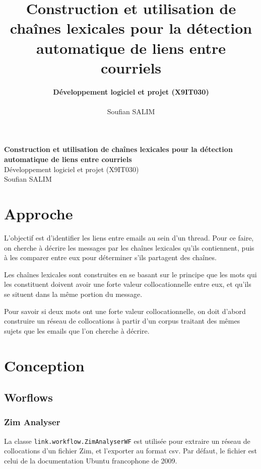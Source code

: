\documentclass[a4paper]{article}
\title{\bf Construction et utilisation de chaînes lexicales pour la détection automatique de liens entre courriels}
\author{
    \textbf{Développement logiciel et projet (X9IT030)} \\
    \\
    Soufian SALIM
}
\begin{document}
\begin{titlepage}
	\vspace*{\fill}
	
	\begin{center}
		{\Large \bf Construction et utilisation de chaînes lexicales pour la détection automatique de liens entre courriels}\\[0.8cm]
		{\Large Développement logiciel et projet (X9IT030)}\\[0.8cm]
		{Soufian SALIM}\\[0.8cm]
	\end{center}
	
	\vspace*{\fill}
\end{titlepage}

\newpage

\section{Approche}

L'objectif est d'identifier les liens entre emails au sein d'un thread. Pour ce faire, on cherche à décrire les messages par les chaînes lexicales qu'ils contiennent, puis à les comparer entre eux pour déterminer s'ils partagent des chaînes.

Les chaînes lexicales sont construites en se basant sur le principe que les mots qui les constituent doivent avoir une forte valeur collocationnelle entre eux, et qu'ils se situent dans la même portion du message.

Pour savoir si deux mots ont une forte valeur collocationnelle, on doit d'abord construire un réseau de collocations à partir d'un corpus traitant des mêmes sujets que les emails que l'on cherche à décrire.

\section{Conception}

\subsection{Worflows}

\subsubsection{Zim Analyser}

La classe \texttt{link.workflow.ZimAnalyserWF} est utilisée pour extraire un réseau de collocations d'un fichier Zim, et l'exporter au format csv. Par défaut, le fichier est celui de la documentation Ubuntu francophone de 2009.
\end{document}
